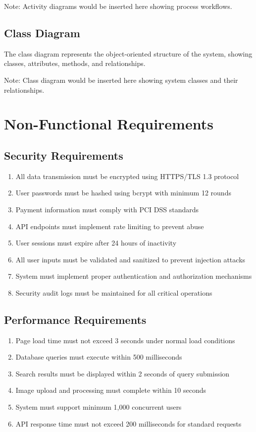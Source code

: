 \documentclass[12pt,a4paper]{report}
\begin{document}
Note: Activity diagrams would be inserted here showing process workflows.

\section{Class Diagram}
The class diagram represents the object-oriented structure of the system, showing classes, attributes, methods, and relationships.

Note: Class diagram would be inserted here showing system classes and their relationships.

\chapter{Non-Functional Requirements}

\section{Security Requirements}
\begin{enumerate}
    \item All data transmission must be encrypted using HTTPS/TLS 1.3 protocol
    \item User passwords must be hashed using bcrypt with minimum 12 rounds
    \item Payment information must comply with PCI DSS standards
    \item API endpoints must implement rate limiting to prevent abuse
    \item User sessions must expire after 24 hours of inactivity
    \item All user inputs must be validated and sanitized to prevent injection attacks
    \item System must implement proper authentication and authorization mechanisms
    \item Security audit logs must be maintained for all critical operations
\end{enumerate}

\section{Performance Requirements}
\begin{enumerate}
    \item Page load time must not exceed 3 seconds under normal load conditions
    \item Database queries must execute within 500 milliseconds
    \item Search results must be displayed within 2 seconds of query submission
    \item Image upload and processing must complete within 10 seconds
    \item System must support minimum 1,000 concurrent users
    \item API response time must not exceed 200 milliseconds for standard requests
\end{enumerate}
\end{document}
